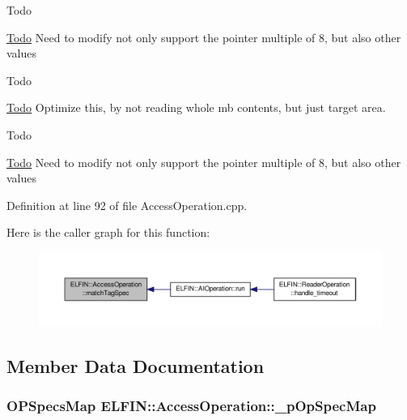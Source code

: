 \begin{DoxyRefDesc}{Todo}
\item[\hyperlink{todo__todo000003}{Todo}]Need to modify not only support the pointer multiple of 8, but also other values \end{DoxyRefDesc}


\begin{DoxyRefDesc}{Todo}
\item[\hyperlink{todo__todo000004}{Todo}]Optimize this, by not reading whole mb contents, but just target area. \end{DoxyRefDesc}


\begin{DoxyRefDesc}{Todo}
\item[\hyperlink{todo__todo000005}{Todo}]Need to modify not only support the pointer multiple of 8, but also other values \end{DoxyRefDesc}


Definition at line 92 of file Access\-Operation.\-cpp.



Here is the caller graph for this function\-:
\nopagebreak
\begin{figure}[H]
\begin{center}
\leavevmode
\includegraphics[width=350pt]{class_e_l_f_i_n_1_1_access_operation_a9f928363dd0ab1a6a0ef2f3e594e60a4_icgraph}
\end{center}
\end{figure}




\subsection{Member Data Documentation}
\hypertarget{class_e_l_f_i_n_1_1_access_operation_ac62e4350f2fa25abff5ffa61ac853a90}{
\subsubsection[{\-\_\-p\-Op\-Spec\-Map}]{\setlength{\rightskip}{0pt plus 5cm}O\-P\-Specs\-Map E\-L\-F\-I\-N\-::\-Access\-Operation\-::\-\_\-p\-Op\-Spec\-Map\hspace{0.3cm}{\ttfamily [private]}}}\label{class_e_l_f_i_n_1_1_access_operation_ac62e4350f2fa25abff5ffa61ac853a90}


